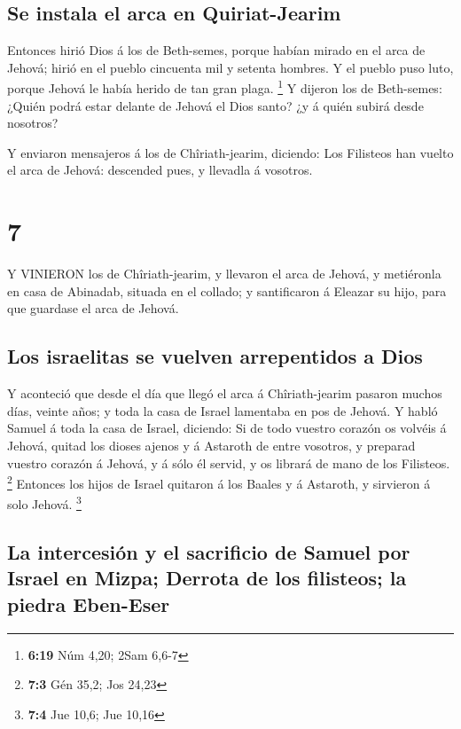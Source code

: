 \hypertarget{se-instala-el-arca-en-quiriat-jearim}{%
\subsection{Se instala el arca en
Quiriat-Jearim}\label{se-instala-el-arca-en-quiriat-jearim}}

 Entonces hirió Dios á los de Beth-semes, porque habían
mirado en el arca de Jehová; hirió en el pueblo cincuenta mil y setenta
hombres. Y el pueblo puso luto, porque Jehová le había herido de tan
gran plaga. \footnote{\textbf{6:19} Núm 4,20; 2Sam 6,6-7} 
Y dijeron los de Beth-semes: ¿Quién podrá estar delante de Jehová el
Dios santo? ¿y á quién subirá desde nosotros?

 Y enviaron mensajeros á los de Chîriath-jearim, diciendo:
Los Filisteos han vuelto el arca de Jehová: descended pues, y llevadla á
vosotros.

\hypertarget{section-6}{%
\section{7}\label{section-6}}

 Y VINIERON los de Chîriath-jearim, y llevaron el arca de
Jehová, y metiéronla en casa de Abinadab, situada en el collado; y
santificaron á Eleazar su hijo, para que guardase el arca de Jehová.

\hypertarget{los-israelitas-se-vuelven-arrepentidos-a-dios}{%
\subsection{Los israelitas se vuelven arrepentidos a
Dios}\label{los-israelitas-se-vuelven-arrepentidos-a-dios}}

 Y aconteció que desde el día que llegó el arca á
Chîriath-jearim pasaron muchos días, veinte años; y toda la casa de
Israel lamentaba en pos de Jehová.  Y habló Samuel á toda la
casa de Israel, diciendo: Si de todo vuestro corazón os volvéis á
Jehová, quitad los dioses ajenos y á Astaroth de entre vosotros, y
preparad vuestro corazón á Jehová, y á sólo él servid, y os librará de
mano de los Filisteos. \footnote{\textbf{7:3} Gén 35,2; Jos 24,23}
 Entonces los hijos de Israel quitaron á los Baales y á
Astaroth, y sirvieron á solo Jehová. \footnote{\textbf{7:4} Jue 10,6;
  Jue 10,16}

\hypertarget{la-intercesiuxf3n-y-el-sacrificio-de-samuel-por-israel-en-mizpa-derrota-de-los-filisteos-la-piedra-eben-eser}{%
\subsection{La intercesión y el sacrificio de Samuel por Israel en
Mizpa; Derrota de los filisteos; la piedra
Eben-Eser}\label{la-intercesiuxf3n-y-el-sacrificio-de-samuel-por-israel-en-mizpa-derrota-de-los-filisteos-la-piedra-eben-eser}}

